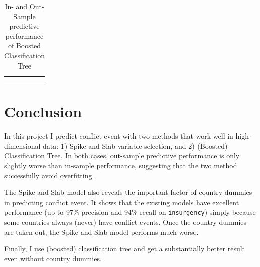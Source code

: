\documentclass{article}
\begin{document}
\begin{table}[H]
\centering
\begin{tabular}{c}
\subfloat[In-Sample]{\label{tab:boosting_insample}
	}\\
\subfloat[Out-Sample]{\label{tab:boosting_outsample}
	}
\end{tabular}
\caption{In- and Out-Sample predictive performance of Boosted Classification Tree}
\end{table}

\section{Conclusion}

In this project I predict conflict event with two methods that work well in high-dimensional data: 1) Spike-and-Slab variable selection, and 2) (Boosted) Classification Tree. In both cases, out-sample predictive performance is only slightly worse than in-sample performance, suggesting that the two method successfully avoid overfitting.

The Spike-and-Slab model also reveals the important factor of country dummies in predicting conflict event. It shows that the existing models have excellent performance (up to 97\% precision and 94\% recall on \verb|insurgency|) simply because some countries always (never) have conflict events. Once the country dummies are taken out, the Spike-and-Slab model performs much worse.

Finally, I use (boosted) classification tree and get a substantially better result even without country dummies.
\end{document}
